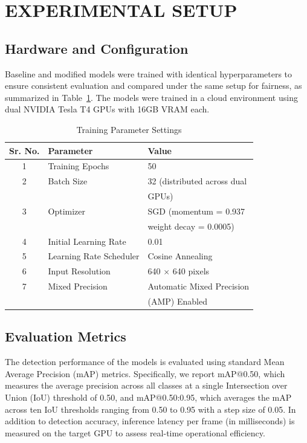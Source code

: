 \documentclass[conference]{IEEEtran}
\begin{document}
\section{EXPERIMENTAL SETUP}

\subsection{Hardware and Configuration}

Baseline and modified models were trained with identical hyperparameters to ensure consistent evaluation and compared under the same setup for fairness, as summarized in Table~\ref{tab:param}. The models were trained in a cloud environment using dual NVIDIA Tesla T4 GPUs with 16GB VRAM each. 
\begin{table}[h]
\centering
\caption{Training Parameter Settings}
\label{tab:param}
\begin{tabular}{|c|l|l|}
\hline
\textbf{Sr. No.} & \textbf{Parameter} & \textbf{Value} \\ 
\hline
1 & Training Epochs & 50 \\ 
\hline
2 & Batch Size & 32 (distributed across dual \\ 
&&  GPUs)\\
\hline
3 & Optimizer & SGD (momentum = 0.937\\ 
&&  weight decay = 0.0005) \\
\hline
4 & Initial Learning Rate & 0.01 \\ 
\hline
5 & Learning Rate Scheduler & Cosine Annealing \\ 
\hline
6 & Input Resolution & 640 $\times$ 640 pixels \\ 
\hline
7 & Mixed Precision & Automatic Mixed Precision  \\ 

&&(AMP) Enabled\\
\hline
\end{tabular}
\end{table}

\subsection{Evaluation Metrics}
The detection performance of the models is evaluated using standard Mean Average Precision (mAP) metrics. Specifically, we report mAP@0.50, which measures the average precision across all classes at a single Intersection over Union (IoU) threshold of 0.50, and mAP@0.50:0.95, which averages the mAP across ten IoU thresholds ranging from 0.50 to 0.95 with a step size of 0.05. In addition to detection accuracy, inference latency per frame (in milliseconds) is measured on the target GPU to assess real-time operational efficiency.
\end{document}
